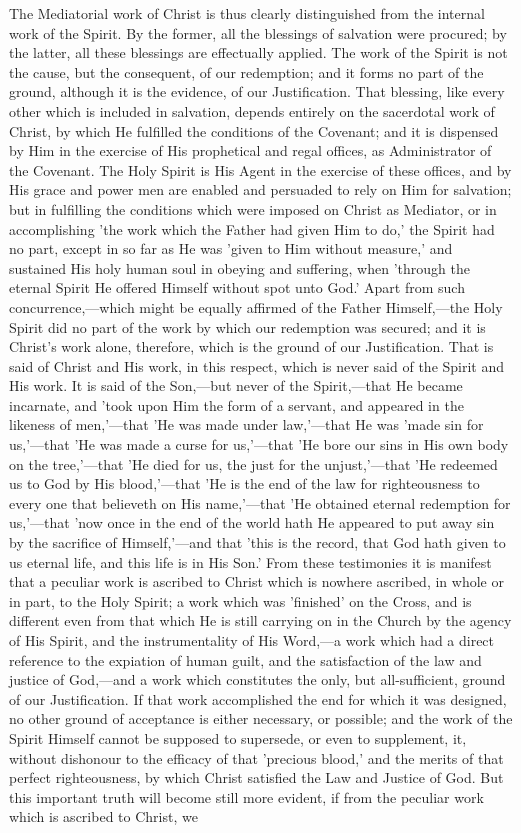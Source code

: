 \documentclass[
]{book}
\begin{document}
The Mediatorial work of Christ is thus clearly distinguished from the internal work of the Spirit. By the former, all the blessings of salvation were procured; by the latter, all these blessings are effectually applied. The work of the Spirit is not the cause, but the consequent, of our redemption; and it forms no part of the ground, although it is the evidence, of our Justification. That blessing, like every other which is included in salvation, depends entirely on the sacerdotal work of Christ, by which He fulfilled the conditions of the Covenant; and it is dispensed by Him in the exercise of His prophetical and regal offices, as Administrator of the Covenant. The Holy Spirit is His Agent in the exercise of these offices, and by His grace and power men are enabled and persuaded to rely on Him for salvation; but in fulfilling the conditions which were imposed on Christ as Mediator, or in accomplishing 'the work which the Father had given Him to do,' the Spirit had no part, except in so far as He was 'given to Him without measure,' and sustained His holy human soul in obeying and suffering, when 'through the eternal Spirit He offered Himself without spot unto God.' Apart from such concurrence,---which might be equally affirmed of the Father Himself,---the Holy Spirit did no part of the work by which our redemption was secured; and it is Christ's work alone, therefore, which is the ground of our Justification. That is said of Christ and His work, in this respect, which is never said of the Spirit and His work. It is said of the Son,---but never of the Spirit,---that He became incarnate, and 'took upon Him the form of a servant, and appeared in the likeness of men,'---that 'He was made under law,'---that He was 'made sin for us,'---that 'He was made a curse for us,'---that 'He bore our sins in His own body on the tree,'---that 'He died for us, the just for the unjust,'---that 'He redeemed us to God by His blood,'---that 'He is the end of the law for righteousness to every one that believeth on His name,'---that 'He obtained eternal redemption for us,'---that 'now once in the end of the world hath He appeared to put away sin by the sacrifice of Himself,'---and that 'this is the record, that God hath given to us eternal life, and this life is in His Son.' From these testimonies it is manifest that a peculiar work is ascribed to Christ which is nowhere ascribed, in whole or in part, to the Holy Spirit; a work which was 'finished' on the Cross, and is different even from that which He is still carrying on in the Church by the agency of His Spirit, and the instrumentality of His Word,---a work which had a direct reference to the expiation of human guilt, and the satisfaction of the law and justice of God,---and a work which constitutes the only, but all-sufficient, ground of our Justification. If that work accomplished the end for which it was designed, no other ground of acceptance is either necessary, or possible; and the work of the Spirit Himself cannot be supposed to supersede, or even to supplement, it, without dishonour to the efficacy of that 'precious blood,' and the merits of that perfect righteousness, by which Christ satisfied the Law and Justice of God. But this important truth will become still more evident, if from the peculiar work which is ascribed to Christ, we 
\end{document}

